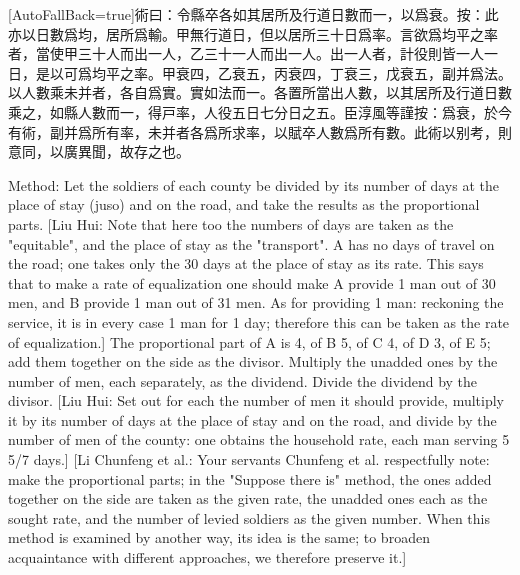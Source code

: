 \documentclass[11pt]{article}
\newcommand{\zhsmall}{\footnotesize\color{black!70}}
\newcommand{\unitlabel}[1]{\marginpar{\raggedleft\tiny\color{gray}#1}}
\newenvironment{unitzh}{\par\CJKfontspec{Noto Serif CJK SC}[AutoFallBack=true]\large\linespread{1.25}\selectfont}{\par}
\newenvironment{uniten}{\par\small\color{black!85}}{\par\medskip}
\begin{document}
\begin{unitzh}\unitlabel{jiuzhang-023.8}術曰：令縣卒各如其居所及行道日數而一，以爲衰。{\zhsmall 按：此亦以日數爲均，居所爲輸。甲無行道日，但以居所三十日爲率。言欲爲均平之率者，當使甲三十人而出一人，乙三十一人而出一人。出一人者，計役則皆一人一日，是以可爲均平之率。}甲衰四，乙衰五，丙衰四，丁衰三，戊衰五，副并爲法。以人數乘未并者，各自爲實。實如法而一。{\zhsmall 各置所當出人數，以其居所及行道日數乘之，如縣人數而一，得戸率，人役五日七分日之五。}{\zhsmall 臣淳風等謹按：爲衰，於今有術，副并爲所有率，未并者各爲所求率，以賦卒人數爲所有數。此術以别考，則意同，以廣異聞，故存之也。}\end{unitzh}
\begin{uniten}Method: Let the soldiers of each county be divided by its number of days at the place of stay (juso) and on the road, and take the results as the proportional parts. [Liu Hui: Note that here too the numbers of days are taken as the "equitable", and the place of stay as the "transport". A has no days of travel on the road; one takes only the 30 days at the place of stay as its rate. This says that to make a rate of equalization one should make A provide 1 man out of 30 men, and B provide 1 man out of 31 men. As for providing 1 man: reckoning the service, it is in every case 1 man for 1 day; therefore this can be taken as the rate of equalization.] The proportional part of A is 4, of B 5, of C 4, of D 3, of E 5; add them together on the side as the divisor. Multiply the unadded ones by the number of men, each separately, as the dividend. Divide the dividend by the divisor. [Liu Hui: Set out for each the number of men it should provide, multiply it by its number of days at the place of stay and on the road, and divide by the number of men of the county: one obtains the household rate, each man serving 5 5/7 days.] [Li Chunfeng et al.: Your servants Chunfeng et al. respectfully note: make the proportional parts; in the "Suppose there is" method, the ones added together on the side are taken as the given rate, the unadded ones each as the sought rate, and the number of levied soldiers as the given number. When this method is examined by another way, its idea is the same; to broaden acquaintance with different approaches, we therefore preserve it.]\end{uniten}
\end{document}
